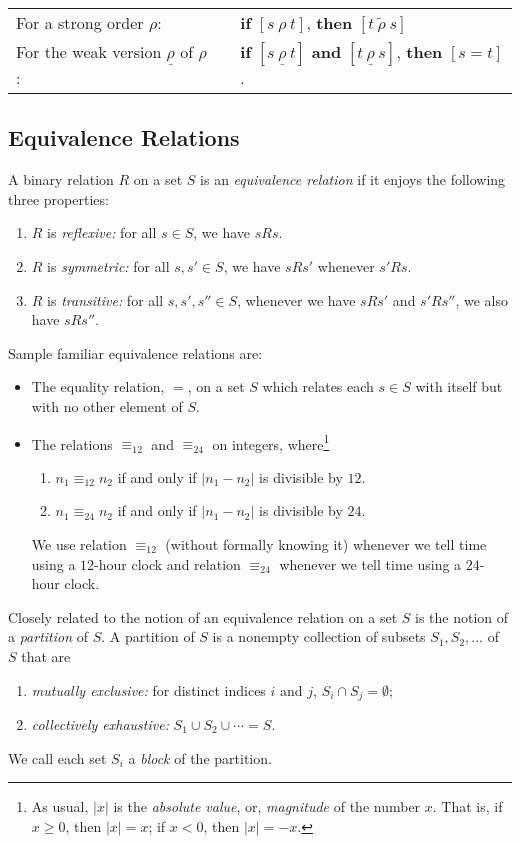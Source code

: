 \smallskip

\begin{tabular}{lll}
For a strong order $\rho$: & &
{\bf if} $[s \ \rho \ t]$, {\bf then} $[t \ \widetilde{\rho} \ s]$ \\
For the weak version $\underline{\rho}$ of $\rho$: & &
{\bf if} $[s \ \underline{\rho} \ t]$ {\bf and} $[t \ \underline{\rho}
  \ s]$, {\bf then} $[s = t]$.
\end{tabular}

\subsection{Equivalence Relations}
\label{s.equiv-rel}

A binary relation $R$ on a set $S$ is an {\it equivalence
  relation} if it enjoys the following
three properties:
\begin{enumerate}
\item
$R$ is {\em reflexive:} for all $s \in S$, we have $sRs$.
\item
$R$ is {\em symmetric:} for all $s, s' \in S$, we have $sRs'$ whenever
  $s'Rs$.
\item
$R$ is {\em transitive:} for all $s, s', s'' \in S$, whenever we have
  $sRs'$ and $s'Rs''$, we also have $sRs''$.
\end{enumerate}
Sample familiar  equivalence relations are:
\begin{itemize}
\item
The equality relation, $=$, on a set $S$ which relates each $s \in S$
with itself but with no other element of $S$.
\item
The relations $\equiv_{12}$ and $\equiv_{24}$ on integers,
where\footnote{As usual, $|x|$ is the {\em absolute value}, or, {\em
    magnitude} of the number $x$.  That is, if $x \geq 0$, then $|x| =
  x$; if $x < 0$, then $|x| = -x$.}
  \begin{enumerate}
  \item
$n_1 \equiv_{12} n_2$ if and only if $|n_1 - n_2|$ is divisible by
$12$.
  \item
$n_1 \equiv_{24} n_2$ if and only if $|n_1 - n_2|$ is divisible by
$24$.
  \end{enumerate}
We use relation $\equiv_{12}$ (without formally knowing it) whenever
we tell time using a $12$-hour clock and relation $\equiv_{24}$
whenever we tell time using a $24$-hour clock.
\end{itemize}

Closely related to the notion of an equivalence relation on a set $S$
is the notion of a {\it partition} of $S$.  A partition of $S$ is a
nonempty collection of subsets $S_1, S_2, \ldots$ of $S$ that are
\begin{enumerate}
\item
{\em mutually exclusive:}
for distinct indices $i$ and $j$, $S_i \cap S_j = \emptyset$;
\item
{\em collectively exhaustive:}
$S_1 \cup S_2 \cup \cdots = S$.
\end{enumerate}
We call each set $S_i$ a {\it block} of the partition.

